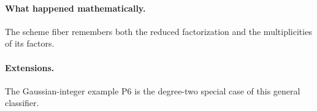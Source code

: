 \paragraph{What happened mathematically.}
The scheme fiber remembers both the reduced factorization and the multiplicities of its factors.

\paragraph{Extensions.}
The Gaussian-integer example P6 is the degree-two special case of this general classifier.
\fi
